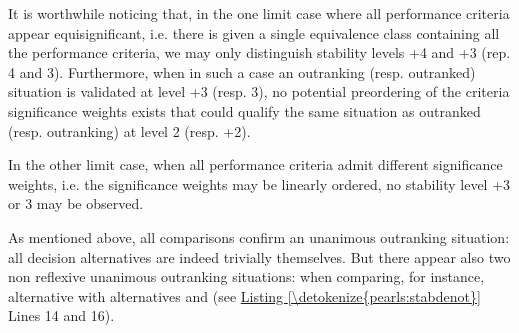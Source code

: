 \documentclass[a4paper,12pt,english]{sphinxhowto}
\begin{document}
\sphinxAtStartPar
It is worthwhile noticing that, in the one limit case where all performance criteria appear equi\sphinxhyphen{}significant, i.e. there is given a single equivalence class containing all the performance criteria, we may only distinguish stability levels +4 and +3 (rep. \sphinxhyphen{}4 and \sphinxhyphen{}3). Furthermore, when in such a case an outranking (resp. outranked) situation is validated at level +3 (resp. \sphinxhyphen{}3), no potential preordering of the criteria significance weights exists that could qualify the same situation as outranked (resp. outranking) at level \sphinxhyphen{}2 (resp. +2).

\sphinxAtStartPar
In the other limit case, when all performance criteria admit different significance weights, i.e. the significance weights may be linearly ordered, no stability level +3 or \sphinxhyphen{}3 may be observed.

\sphinxAtStartPar
As mentioned above, all  comparisons confirm an unanimous outranking situation: all decision alternatives are indeed trivially  themselves. But there appear also two non reflexive unanimous outranking situations: when comparing, for instance, alternative  with alternatives  and  (see \hyperref[\detokenize{pearls:stabdenot}]{Listing \ref{\detokenize{pearls:stabdenot}}} Lines 14 and 16).
\end{document}
